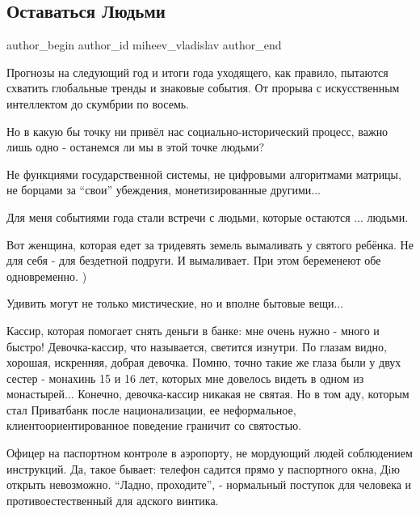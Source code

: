  
 
 
 
 
 
\subsection{Оставаться Людьми}
\label{sec:31_12_2021.fb.miheev_vladislav.1.ostavatjsja_ljudmi}
 
\ifcmt
 author_begin
   author_id miheev_vladislav
 author_end
\fi

Прогнозы на следующий год и итоги года уходящего, как правило, пытаются
схватить глобальные тренды и знаковые события. От прорыва с искусственным
интеллектом до скумбрии по восемь.

Но в какую бы точку ни привёл нас социально-исторический процесс, важно лишь
одно - останемся ли мы в этой точке людьми?

Не функциями  государственной системы,  не цифровыми алгоритмами матрицы, не
борцами за \enquote{свои} убеждения, монетизированные другими...

Для меня событиями года стали встречи с людьми, которые остаются ... людьми.

Вот женщина, которая едет за тридевять земель вымаливать у святого ребёнка. Не
для себя -  для бездетной подруги. И вымаливает. При этом беременеют обе
одновременно. )

Удивить могут не только мистические, но и вполне бытовые вещи...

Кассир, которая помогает снять деньги в банке:  мне очень нужно - много и
быстро! Девочка-кассир, что называется, светится изнутри. По глазам видно,
хорошая, искренняя, добрая девочка.  Помню, точно такие же глаза были у двух
сестер - монахинь 15 и 16 лет, которых мне довелось видеть в одном из
монастырей...  Конечно, девочка-кассир никакая не святая. Но в том аду, которым
стал Приватбанк после национализации, ее неформальное, клиентоориентированное
поведение граничит со святостью.

Офицер на паспортном контроле в аэропорту,  не  мордующий людей соблюдением
инструкций. Да, такое бывает: телефон садится прямо у паспортного окна, Дiю
открыть невозможно. \enquote{Ладно, проходите}, -  нормальный поступок для человека и
противоестественный для адского винтика.

